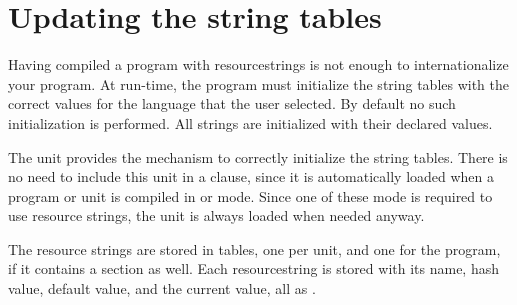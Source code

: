 \section{Updating the string tables}
Having compiled a program with resourcestrings is not enough to
internationalize your program. At run-time, the program must initialize
the string tables with the correct values for the language that the user
selected. By default no such initialization is performed. All strings
are initialized with their declared values.

The  unit provides the mechanism to correctly initialize
the string tables. There is no need to include this unit in a 
clause, since it is automatically loaded when a program or unit is
compiled in  or  mode. Since one of these mode 
is required to use resource strings, the unit is always loaded when needed
anyway.

The resource strings are stored in tables, one per unit, and one for the
program, if it contains a  section as well. Each
resourcestring is stored with its name, hash value, default value, and
the current value, all as .

